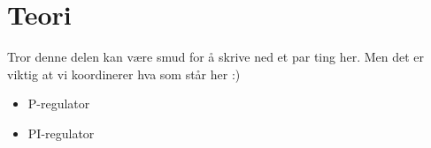 \section{Teori}

Tror denne delen kan være smud for å skrive ned et par ting her. Men det er viktig at vi koordinerer hva som står her :)

\begin{itemize}
    \item P-regulator
    \item PI-regulator
\end{itemize}
